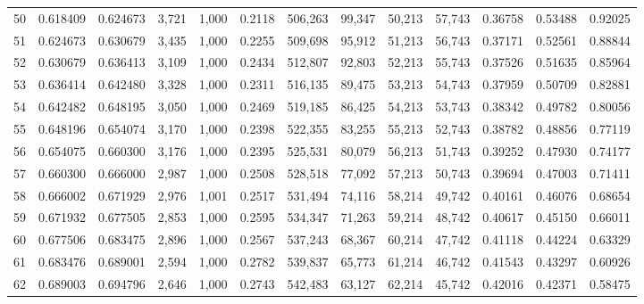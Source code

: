 \begin{tabular}{rrrrrrrrrrrrr}
50  &  0.618409 &  0.624673 &   3,721 &  1,000 &                                     0.2118 &  506,263 &   99,347 &   50,213 &   57,743 &  0.36758 &  0.53488 &  0.92025 \\
51  &  0.624673 &  0.630679 &   3,435 &  1,000 &                                     0.2255 &  509,698 &   95,912 &   51,213 &   56,743 &  0.37171 &  0.52561 &  0.88844 \\
52  &  0.630679 &  0.636413 &   3,109 &  1,000 &                                     0.2434 &  512,807 &   92,803 &   52,213 &   55,743 &  0.37526 &  0.51635 &  0.85964 \\
53  &  0.636414 &  0.642480 &   3,328 &  1,000 &                                     0.2311 &  516,135 &   89,475 &   53,213 &   54,743 &  0.37959 &  0.50709 &  0.82881 \\
54  &  0.642482 &  0.648195 &   3,050 &  1,000 &                                     0.2469 &  519,185 &   86,425 &   54,213 &   53,743 &  0.38342 &  0.49782 &  0.80056 \\
55  &  0.648196 &  0.654074 &   3,170 &  1,000 &                                     0.2398 &  522,355 &   83,255 &   55,213 &   52,743 &  0.38782 &  0.48856 &  0.77119 \\
56  &  0.654075 &  0.660300 &   3,176 &  1,000 &                                     0.2395 &  525,531 &   80,079 &   56,213 &   51,743 &  0.39252 &  0.47930 &  0.74177 \\
57  &  0.660300 &  0.666000 &   2,987 &  1,000 &                                     0.2508 &  528,518 &   77,092 &   57,213 &   50,743 &  0.39694 &  0.47003 &  0.71411 \\
58  &  0.666002 &  0.671929 &   2,976 &  1,001 &                                     0.2517 &  531,494 &   74,116 &   58,214 &   49,742 &  0.40161 &  0.46076 &  0.68654 \\
59  &  0.671932 &  0.677505 &   2,853 &  1,000 &                                     0.2595 &  534,347 &   71,263 &   59,214 &   48,742 &  0.40617 &  0.45150 &  0.66011 \\
60  &  0.677506 &  0.683475 &   2,896 &  1,000 &                                     0.2567 &  537,243 &   68,367 &   60,214 &   47,742 &  0.41118 &  0.44224 &  0.63329 \\
61  &  0.683476 &  0.689001 &   2,594 &  1,000 &                                     0.2782 &  539,837 &   65,773 &   61,214 &   46,742 &  0.41543 &  0.43297 &  0.60926 \\
62  &  0.689003 &  0.694796 &   2,646 &  1,000 &                                     0.2743 &  542,483 &   63,127 &   62,214 &   45,742 &  0.42016 &  0.42371 &  0.58475 \\

\end{tabular}
